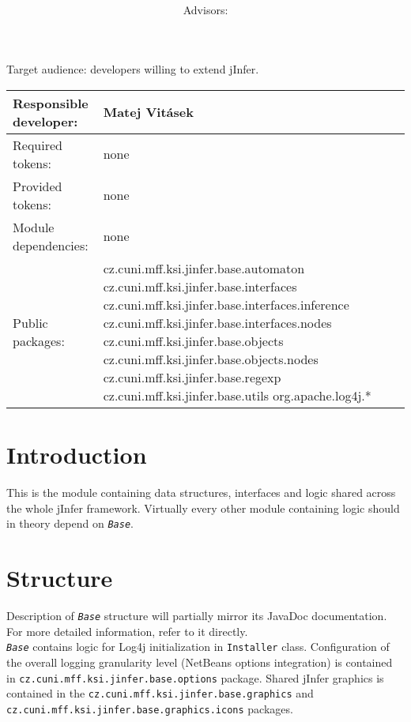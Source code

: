 \documentclass[a4paper,10pt,oneside]{article}
\title{\bf\mftitle}
\author{\mfauthor \\ Advisors: \mfadvisor}
\date{\mfplacedate}
\newcommand{\code}[1]{\texttt{#1}}
\newcommand{\jmodule}[1]{\texttt{\textit{#1}}}
\begin{document}
\maketitle
\noindent Target audience: developers willing to extend jInfer.

\noindent \begin{tabular}{|l|l|} \hline
Responsible developer: & Matej Vitásek \\ \hline
Required tokens:       & none \\ \hline
Provided tokens:       & none \\ \hline
Module dependencies:   & none \\ \hline
Public packages:       & cz.cuni.mff.ksi.jinfer.base.automaton \newline
cz.cuni.mff.ksi.jinfer.base.interfaces \newline
cz.cuni.mff.ksi.jinfer.base.interfaces.inference \newline
cz.cuni.mff.ksi.jinfer.base.interfaces.nodes \newline
cz.cuni.mff.ksi.jinfer.base.objects \newline
cz.cuni.mff.ksi.jinfer.base.objects.nodes \newline
cz.cuni.mff.ksi.jinfer.base.regexp \newline
cz.cuni.mff.ksi.jinfer.base.utils \newline
org.apache.log4j.* \\ \hline
\end{tabular}

\section{Introduction}

This is the module containing data structures, interfaces and logic shared across the whole jInfer framework. Virtually every other module containing logic should in theory depend on \jmodule{Base}.

\section{Structure}

Description of \jmodule{Base} structure will partially mirror its JavaDoc documentation. For more detailed information, refer to it directly.\\

\jmodule{Base} contains logic for Log4j initialization in \code{Installer} class. Configuration of the overall logging granularity level (NetBeans options integration) is contained in \code{cz.cuni.mff.ksi.jinfer.base.options} package. Shared jInfer graphics is contained in the \code{cz.cuni.mff.ksi.jinfer.base.graphics} and \code{cz.cuni.mff.ksi.jinfer.base.graphics.icons} packages.
\end{document}
